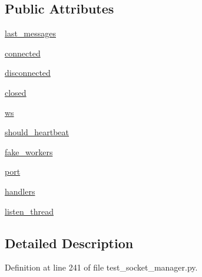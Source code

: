 \subsection*{Public Attributes}
\begin{DoxyCompactItemize}
\item 
\hyperlink{classparlai_1_1mturk_1_1core_1_1test_1_1test__socket__manager_1_1MockSocket_a42a347cb3c318dbec504faba065e2186}{last\+\_\+messages}
\item 
\hyperlink{classparlai_1_1mturk_1_1core_1_1test_1_1test__socket__manager_1_1MockSocket_aabc1cc6796247db920bc5e36bc245b1c}{connected}
\item 
\hyperlink{classparlai_1_1mturk_1_1core_1_1test_1_1test__socket__manager_1_1MockSocket_ae83a76b1642457255c25ef378497cee1}{disconnected}
\item 
\hyperlink{classparlai_1_1mturk_1_1core_1_1test_1_1test__socket__manager_1_1MockSocket_a780461a398bbc8e99b6a149921e16f4d}{closed}
\item 
\hyperlink{classparlai_1_1mturk_1_1core_1_1test_1_1test__socket__manager_1_1MockSocket_ae2988bb7b53c335c9bdda34f592ae40c}{ws}
\item 
\hyperlink{classparlai_1_1mturk_1_1core_1_1test_1_1test__socket__manager_1_1MockSocket_a5ea30f810f115aa211cc2b61356e1cde}{should\+\_\+heartbeat}
\item 
\hyperlink{classparlai_1_1mturk_1_1core_1_1test_1_1test__socket__manager_1_1MockSocket_a6d9a577d355cbea83c81bfd0e6412b83}{fake\+\_\+workers}
\item 
\hyperlink{classparlai_1_1mturk_1_1core_1_1test_1_1test__socket__manager_1_1MockSocket_a877e6aa7efaa5ad3e19d17a5db5bb825}{port}
\item 
\hyperlink{classparlai_1_1mturk_1_1core_1_1test_1_1test__socket__manager_1_1MockSocket_a202a039dee0fd4cca724ce0914d303eb}{handlers}
\item 
\hyperlink{classparlai_1_1mturk_1_1core_1_1test_1_1test__socket__manager_1_1MockSocket_ac68a12582d8a0e13acc7677616401c0f}{listen\+\_\+thread}
\end{DoxyCompactItemize}


\subsection{Detailed Description}


Definition at line 241 of file test\+\_\+socket\+\_\+manager.\+py.



